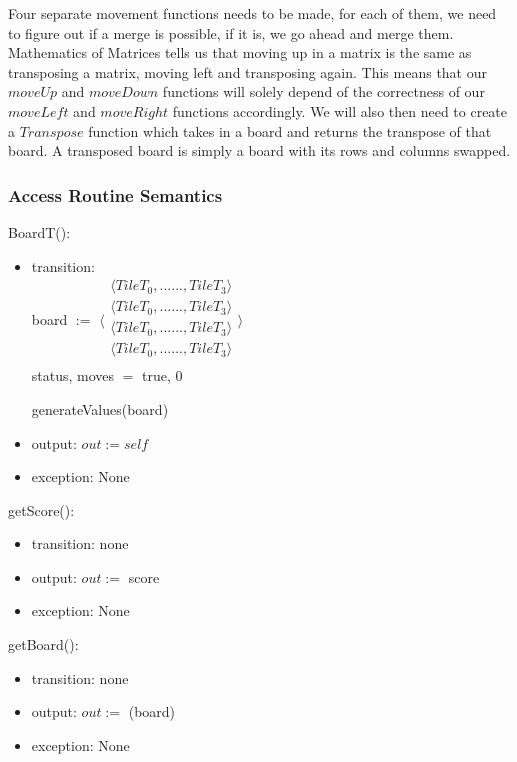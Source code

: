 \documentclass[12pt]{article}
\begin{document}
Four separate movement functions needs to be made, for each of them, we need to figure out if a merge is possible, if it is, we go ahead and merge them. Mathematics of Matrices tells us that moving up in a matrix is the same as transposing a matrix, moving left and transposing again. This means that our $moveUp$ and $moveDown$ functions will solely depend of the correctness of our $moveLeft$ and $moveRight$ functions accordingly. We will also then need to create a $Transpose$ function which takes in a board and returns the transpose of that board. A transposed board is simply a board with its rows and columns swapped.


\subsubsection* {Access Routine Semantics}

BoardT():
\begin{itemize}
\item transition: \\
      board $:=$
      $\langle \begin{array}{c}
      \langle TileT_0, ... ... ,TileT_3 \rangle\\
      \langle TileT_0, ... ... ,TileT_3 \rangle\\
      \langle TileT_0, ... ... ,TileT_3 \rangle\\
      \langle TileT_0, ... ... ,TileT_3 \rangle\\\
      \end{array} \rangle$ \\
      status, moves $=$ true, 0

      generateValues(board)
\item output: $out := \mathit{self}$
\item exception: None
\end{itemize}

\noindent getScore():
\begin{itemize}
\item transition: none
\item output: $out :=$ score
\item exception: None
\end{itemize}

\noindent getBoard():
\begin{itemize}
\item transition: none
\item output: $out :=$ (board)
\item exception: None
\end{itemize}
\end{document}

